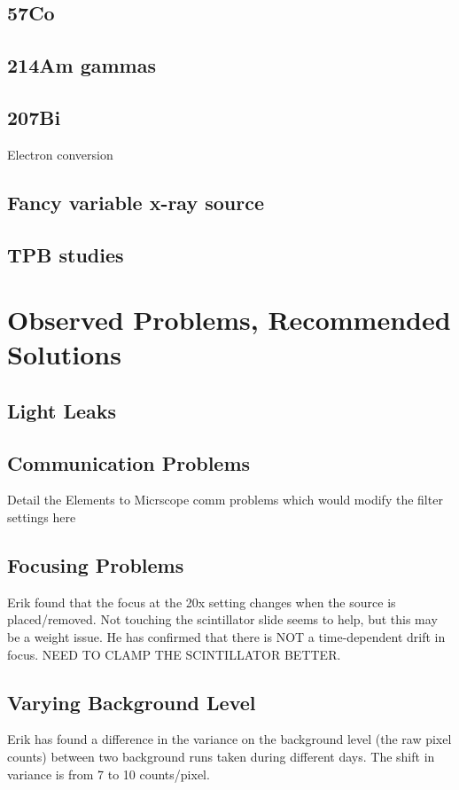 \documentclass[11pt]{amsart}
\begin{document}
 \subsection{57Co}
 
 \subsection{214Am gammas}
 
 \subsection{207Bi}
 Electron conversion
 
 \subsection{Fancy variable x-ray source}
 
 \subsection{TPB studies}
 
 
  
 

\section{Observed Problems, Recommended Solutions}
\subsection{Light Leaks}
\subsection{Communication Problems}
Detail the Elements to Micrscope comm problems which would modify the filter settings here

\subsection{Focusing Problems}
Erik found that the focus at the 20x setting changes when the source is placed/removed. Not touching the scintillator slide seems to help, but this may be a weight issue.
He has confirmed that there is NOT a time-dependent drift in focus. NEED TO CLAMP THE SCINTILLATOR BETTER.

\subsection{Varying Background Level}
Erik has found a difference in the variance on the background level (the raw pixel counts) between two background runs taken during different days. The shift in variance is from 7 to 10 counts/pixel.
\end{document}
